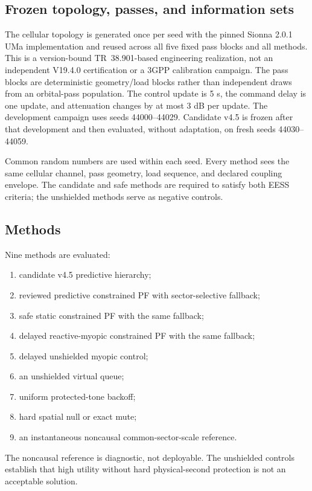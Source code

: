 \documentclass[journal]{IEEEtran}
\begin{document}
\subsection{Frozen topology, passes, and information sets}
The cellular topology is generated once per seed with the pinned Sionna 2.0.1 UMa implementation and reused across all five fixed pass blocks and all methods. This is a version-bound TR~38.901-based engineering realization, not an independent V19.4.0 certification or a 3GPP calibration campaign. The pass blocks are deterministic geometry/load blocks rather than independent draws from an orbital-pass population. The control update is 5 s, the command delay is one update, and attenuation changes by at most 3 dB per update. The development campaign uses seeds 44000--44029. Candidate v4.5 is frozen after that development and then evaluated, without adaptation, on fresh seeds 44030--44059.

Common random numbers are used within each seed. Every method sees the same cellular channel, pass geometry, load sequence, and declared coupling envelope. The candidate and safe methods are required to satisfy both EESS criteria; the unshielded methods serve as negative controls.

\subsection{Methods}
Nine methods are evaluated:
\begin{enumerate}
\item candidate v4.5 predictive hierarchy;
\item reviewed predictive constrained PF with sector-selective fallback;
\item safe static constrained PF with the same fallback;
\item delayed reactive-myopic constrained PF with the same fallback;
\item delayed unshielded myopic control;
\item an unshielded virtual queue;
\item uniform protected-tone backoff;
\item hard spatial null or exact mute;
\item an instantaneous noncausal common-sector-scale reference.
\end{enumerate}
The noncausal reference is diagnostic, not deployable. The unshielded controls establish that high utility without hard physical-second protection is not an acceptable solution.
\end{document}
